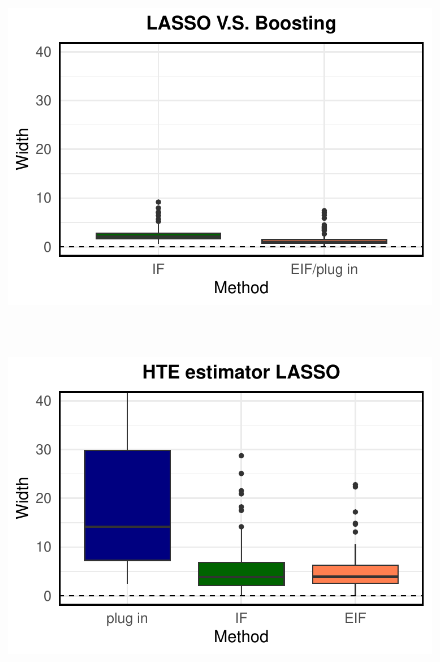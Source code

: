 \begin{figure}[ht]
\begin{minipage}{0.3\textwidth}
                \includegraphics[clip, trim = 0cm 0cm 0cm 0cm, width = \textwidth]{plot/ACIC_linear_propensity_linear_HTE_CI_width_LASSO_V.S._Boosting.pdf}
        \end{minipage}        
        \\
        \begin{minipage}{0.3\textwidth}
                \centering
                \includegraphics[clip, trim = 0cm 0cm 0cm 0cm, width = \textwidth]{plot/ACIC_linear_propensity_nonlinear_HTE_CI_width_LASSO.pdf}
        \end{minipage}
        \begin{minipage}{0.3\textwidth}
                \centering

\end{minipage}
\end{figure}
